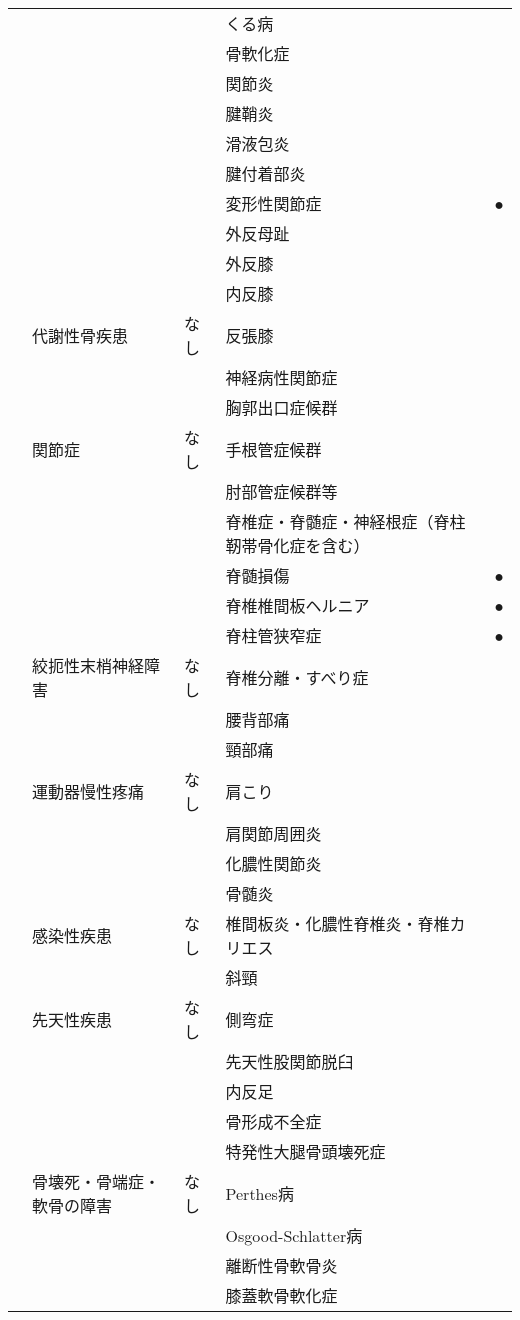 \begin{xltabular}{\linewidth}{XXXXX}
 &  &  & くる病 &  \\
 &  &  & 骨軟化症 &  \\
 &  &  & 関節炎 &  \\
 &  &  & 腱鞘炎 &  \\
 &  &  & 滑液包炎 &  \\
 &  &  & 腱付着部炎 &  \\
 &  &  & 変形性関節症 & ● \\
 &  &  & 外反母趾 &  \\
 &  &  & 外反膝 &  \\
 &  &  & 内反膝 &  \\
 & 代謝性骨疾患 & なし & 反張膝 &  \\
 &  &  & 神経病性関節症 &  \\
 &  &  & 胸郭出口症候群 &  \\
 & 関節症 & なし & 手根管症候群 &  \\
 &  &  & 肘部管症候群等 &  \\
 &  &  & 脊椎症・脊髄症・神経根症（脊柱靭帯骨化症を含む） &  \\
 &  &  & 脊髄損傷 & ● \\
 &  &  & 脊椎椎間板ヘルニア & ● \\
 &  &  & 脊柱管狭窄症 & ● \\
 & 絞扼性末梢神経障害 & なし & 脊椎分離・すべり症 &  \\
 &  &  & 腰背部痛 &  \\
 &  &  & 頸部痛 &  \\
 & 運動器慢性疼痛 & なし & 肩こり &  \\
 &  &  & 肩関節周囲炎 &  \\
 &  &  & 化膿性関節炎 &  \\
 &  &  & 骨髄炎 &  \\
 & 感染性疾患 & なし & 椎間板炎・化膿性脊椎炎・脊椎カリエス &  \\
 &  &  & 斜頸 &  \\
 & 先天性疾患 & なし & 側弯症 &  \\
 &  &  & 先天性股関節脱臼 &  \\
 &  &  & 内反足 &  \\
 &  &  & 骨形成不全症 &  \\
 &  &  & 特発性大腿骨頭壊死症 &  \\
 & 骨壊死・骨端症・軟骨の障害 & なし & Perthes病 &  \\
 &  &  & Osgood-Schlatter病 &  \\
 &  &  & 離断性骨軟骨炎 &  \\
 &  &  & 膝蓋軟骨軟化症 &  \\

\end{xltabular}
